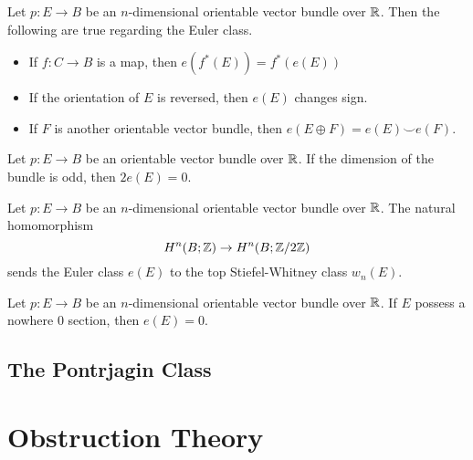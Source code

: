 \documentclass[a4paper]{article}
\begin{document}
\begin{prp}{}{} Let $p:E\to B$ be an $n$-dimensional orientable vector bundle over $\mathbb{R}$. Then the following are true regarding the Euler class. 
\begin{itemize}
\item If $f:C\to B$ is a map, then $e(f^\ast(E))=f^\ast(e(E))$
\item If the orientation of $E$ is reversed, then $e(E)$ changes sign. 
\item If $F$ is another orientable vector bundle, then $e(E\oplus F)=e(E)\smile e(F)$. 
\end{itemize}
\end{prp}

\begin{prp} Let $p:E\to B$ be an orientable vector bundle over $\mathbb{R}$. If the dimension of the bundle is odd, then $2e(E)=0$. 
\end{prp}

\begin{prp}{}{} Let $p:E\to B$ be an $n$-dimensional orientable vector bundle over $\mathbb{R}$. The natural homomorphism $$H^n(B;\mathbb{Z})\to H^n(B;\mathbb{Z}/2\mathbb{Z})$$ sends the Euler class $e(E)$ to the top Stiefel-Whitney class $w_n(E)$. 
\end{prp}

\begin{prp}{}{} Let $p:E\to B$ be an $n$-dimensional orientable vector bundle over $\mathbb{R}$. If $E$ possess a nowhere $0$ section, then $e(E)=0$. 
\end{prp}

\subsection{The Pontrjagin Class}

\pagebreak
\section{Obstruction Theory}
\end{document}
